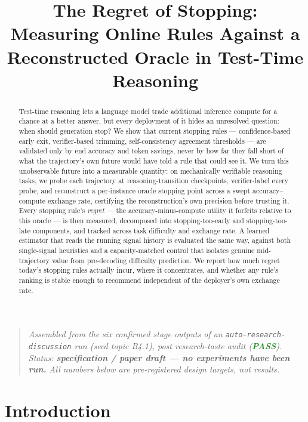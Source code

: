 \documentclass[11pt]{article}
\title{\textbf{The Regret of Stopping:\\ Measuring Online Rules Against a Reconstructed Oracle in Test-Time Reasoning}}
\author{}
\date{}
\begin{document}
\maketitle
\vspace{-2em}

\begin{quote}
\small\textit{Assembled from the six confirmed stage outputs of an \texttt{auto-research-discussion} run (seed topic B4.1), post research-taste audit (\textcolor{ForestGreen}{\textbf{PASS}}). Status: \textbf{specification / paper draft --- no experiments have been run.} All numbers below are pre-registered design targets, not results.}
\end{quote}

\begin{abstract}
Test-time reasoning lets a language model trade additional inference compute for a chance at a better answer, but every deployment of it hides an unresolved question: when should generation stop? We show that current stopping rules --- confidence-based early exit, verifier-based trimming, self-consistency agreement thresholds --- are validated only by end accuracy and token savings, never by how far they fall short of what the trajectory's own future would have told a rule that could see it. We turn this unobservable future into a measurable quantity: on mechanically verifiable reasoning tasks, we probe each trajectory at reasoning-transition checkpoints, verifier-label every probe, and reconstruct a per-instance oracle stopping point across a swept accuracy--compute exchange rate, certifying the reconstruction's own precision before trusting it. Every stopping rule's \emph{regret} --- the accuracy-minus-compute utility it forfeits relative to this oracle --- is then measured, decomposed into stopping-too-early and stopping-too-late components, and tracked across task difficulty and exchange rate. A learned estimator that reads the running signal history is evaluated the same way, against both single-signal heuristics and a capacity-matched control that isolates genuine mid-trajectory value from pre-decoding difficulty prediction. We report how much regret today's stopping rules actually incur, where it concentrates, and whether any rule's ranking is stable enough to recommend independent of the deployer's own exchange rate.
\end{abstract}

\section{Introduction}
\end{document}
